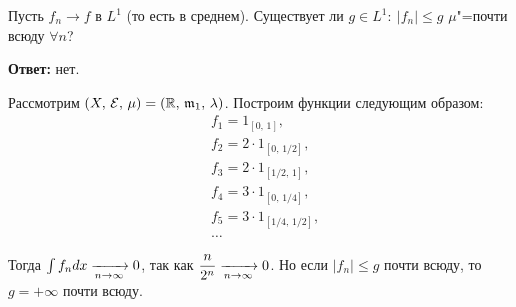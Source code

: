 \newpage
{}

\begin{exercise}
    Пусть $f_n\to f$ в $L^1$ (то есть в среднем).
    Существует ли $g\in L^1:\: |f_n|\leqslant g$ $\mu$"=почти всюду $\forall n$?

    \textbf{Ответ:} нет.

    Рассмотрим $(X,\, \mathcal{E},\, \mu)=(\mathbb{R},\, \mathfrak{m}_1,\, \lambda)$.
    Построим функции следующим образом: \begin{align*}
         & f_1=1_{[0,\, 1]},            \\
         & f_2=2\cdot 1_{[0,\, 1/2]},   \\
         & f_3=2\cdot 1_{[1/2,\, 1]},   \\
         & f_4=3\cdot 1_{[0,\, 1/4]},   \\
         & f_5=3\cdot 1_{[1/4,\, 1/2]}, \\
         & \ldots
    \end{align*}

    Тогда $\int f_ndx\xrightarrow[n\to\infty]{} 0$, так как $\dfrac{n}{2^n}\xrightarrow[n\to\infty]{}0$.
    Но если $|f_n|\leqslant g$ почти всюду, то $g=+\infty$ почти всюду.
\end{exercise}


